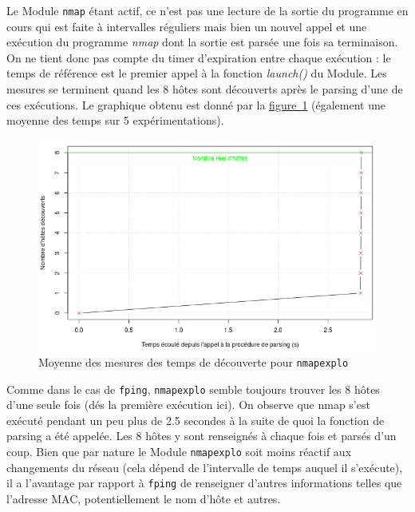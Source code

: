 \documentclass[]{article}
\newcommand{\minit}[1]{\noindent{\small\textbf{ \underline{#1}}}\vspace{0.2cm}}
\newcommand{\wordlink}[2]{\hyperref[#1]{#2~\ref{#1}}}
\begin{document}
\newpage

\minit{Mesures pour \texttt{nmapexplo}}
\vspace{0.1cm}

\par Le Module \texttt{nmap} étant actif, ce n'est pas une lecture de la sortie du programme en cours qui est faite à intervalles réguliers mais bien un nouvel appel et une exécution du programme \textit{nmap} dont la sortie est parsée une fois sa terminaison. On ne tient donc pas compte du timer d'expiration entre chaque exécution : le temps de référence est le premier appel à la fonction \textit{launch()} du Module. Les mesures se terminent quand les 8 hôtes sont découverts après le parsing d'une de ces exécutions. Le graphique obtenu est donné par la \wordlink{explomean}{figure} (également une moyenne des temps sur 5 expérimentations).\\

\begin{figure}[!ht]
\centering
     \includegraphics[width=0.75\linewidth]{explomean}
     \caption{Moyenne des mesures des temps de découverte pour \texttt{nmapexplo}}
     \label{explomean}
\end{figure}

\vspace{0.1cm}

\par Comme dans le cas de \texttt{fping}, \texttt{nmapexplo} semble toujours trouver les 8 hôtes d'une seule fois (dés la première exécution ici). On observe que nmap s'est exécuté pendant un peu plus de 2.5 secondes à la suite de quoi la fonction de parsing a été appelée. Les 8 hôtes y sont renseignés à chaque fois et parsés d'un coup. Bien que par nature le Module \texttt{nmapexplo} soit moins réactif aux changements du réseau (cela dépend de l'intervalle de temps auquel il s'exécute), il a l'avantage par rapport à \texttt{fping} de renseigner d'autres informations telles que l'adresse MAC, potentiellement le nom d'hôte et autres.
\vspace{0.4cm}
\end{document}
